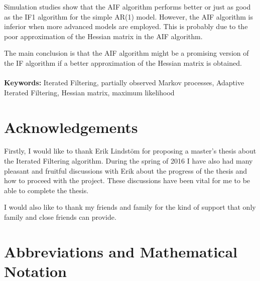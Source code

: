 \documentclass[twoside,openright]{report}
\renewcommand{\arraystretch}{1.5}
\begin{document}
Simulation studies show that the AIF algorithm performs better or just as good as the IF1 algorithm for the simple AR(1) model. However, the AIF algorithm is inferior when more advanced models are employed. This is probably due to the poor approximation of the Hessian matrix in the AIF algorithm.  

The main conclusion is that the AIF algorithm might be a promising version of the IF algorithm if a better approximation of the Hessian matrix is obtained.   
\\\\
\textbf{Keywords:} Iterated Filtering, partially observed Markov processes, Adaptive Iterated Filtering, Hessian matrix, maximum likelihood 
%






\chapter*{Acknowledgements}
%

Firstly, I would like to thank Erik Lindstöm for proposing a master's thesis about the Iterated Filtering algorithm. During the spring of 2016 I have also had many pleasant and fruitful discussions with Erik about the progress of the thesis and how to proceed with the project. These discussions have been vital for me to be able to complete the thesis. 

I would also like to thank my friends and family for the kind of support that only family and close friends can provide. 


\tableofcontents


\chapter*{Abbreviations and Mathematical Notation}
%


\renewcommand{\arraystretch}{2}
\end{document}
